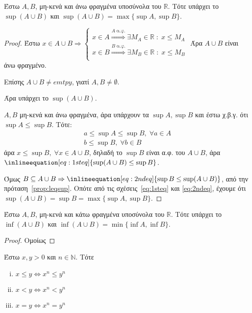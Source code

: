 \documentclass[main.tex]{subfiles}
\begin{document}
\begin{prop}
    Έστω $ A, B $, μη-κενά και άνω φραγμένα υποσύνολα του $ \mathbb{R} $. Τότε υπάρχει 
    το $ \sup (A \cup B) $ και $ \sup (A \cup B) = \max \{ \sup A, \sup B \} $.
\end{prop}

\begin{proof}
    Έστω $ x \in A \cup B \Rightarrow \begin{cases} x \in A \overset{A \; \text{α.φ.}}{
        \Rightarrow} \exists M_{A} \in \mathbb{R} \; : \; x \leq M_{A} \\
        x \in B \overset{B \; \text{α.φ.}}{ \Rightarrow} \exists M_{B} \in \mathbb{R} 
        \; : \; x \leq M_{B}  \\
    \end{cases} $  
    Άρα $ A \cup B $ είναι άνω φραγμένο.

    Επίσης $ A \cup B \neq emtpy $, γιατί $ A, B \neq \emptyset $. 

    Άρα υπάρχει το $ \sup (A \cup B) $.

    $ A,B $ μη-κενά και άνω φραγμένα, άρα υπάρχουν τα $ \sup A, \sup B $ 
    και έστω χ.β.γ.  ότι $ \sup A \leq \sup B $. Τότε:
    \begin{gather*}
        a \leq \sup A \leq \sup B, \; \forall a \in A \\
        b \leq \sup B, \; \forall b \in B 
    \end{gather*}
    άρα $ x \leq \sup B, \; \forall x \in A \cup B  $, δηλαδή το $ \sup B $ 
    είναι α.φ. του $ A \cup B $, άρα $ \inlineequation[eq:1steq]{\sup (A \cup B) 
    \leq \sup B} $.

    Όμως $ B \subseteq A \cup B \Rightarrow \inlineequation[eq:2ndeq]{\sup B \leq 
    \sup (A \cup B)} $, από την πρόταση~\ref{prop:leqsup}. 
    Οπότε από τις σχέσεις~\eqref{eq:1steq} και \eqref{eq:2ndeq}, έχουμε ότι $
    \sup (A \cup B) = \sup B = \max \{ \sup A, \sup B \} $.
\end{proof}

\begin{prop}
    Έστω $ A, B $, μη-κενά και κάτω φραγμένα υποσύνολα του $ \mathbb{R} $. 
    Τότε υπάρχει το $ \inf (A \cup B) $ και $ \inf (A \cup B) = \min \{ \inf A, 
    \inf B \} $.
\end{prop}

\begin{proof}
    Ομοίως
\end{proof}

\begin{lem}\label{lem:ineqs}
    Έστω $ x,y >0 $ και $ n \in \mathbb{N} $. Τότε
    \begin{enumerate}[i)]
        \item $ x \leq y \Leftrightarrow x^{n} \leq y^{n} $
        \item $ x < y \Leftrightarrow x^{n} < y^{n} $ \label{lem:ineqreal2}
        \item $ x = y \Leftrightarrow x^{n} = y^{n} $ \label{lem:ineqreal3}
    \end{enumerate}
\end{lem}
\end{document}
